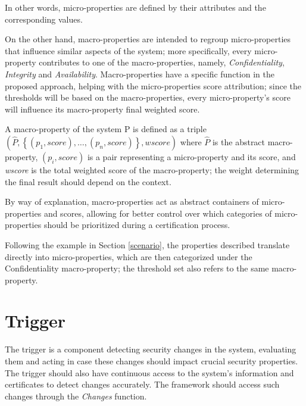 In other words, micro-properties are defined by their attributes and the corresponding values.


On the other hand, macro-properties are intended to regroup micro-properties that influence similar aspects of the system; more specifically, every micro-property contributes to one of the macro-properties, namely, \textit{Confidentiality}, \textit{Integrity} and \textit{Availability}. Macro-properties have a specific function in the proposed approach, helping with the micro-properties score attribution; since the thresholds will be based on the macro-properties, every micro-property's score will influence its macro-property final weighted score.

\begin{defn}
A macro-property of the system P is defined as a triple \\ \( \left ( \hat{P}, \left \{(p_1, score), \dots , (p_n, score )\right \}, wscore \right ) \) where \(\hat{P}\) is the abstract macro-property, \( \left (p_i, score \right ) \) is a pair representing a micro-property and its score, and \textit{wscore} is the total weighted score of the macro-property; the weight determining the final result should depend on the context.
\end{defn}

By way of explanation, macro-properties act as abstract containers of micro-properties and scores, allowing for better control over which categories of micro-properties should be prioritized during a certification process.

\begin{example}
Following the example in Section \ref{scenario}, the properties described translate directly into micro-properties, which are then categorized under the Confidentiality macro-property; the threshold set also refers to the same macro-property.
\end{example}

\section{Trigger}
\label{trigger}
The trigger is a component detecting security changes in the system, evaluating them and acting in case these changes should impact crucial security properties. The trigger should also have continuous access to the system's information and certificates to detect changes accurately. The framework should access such changes through the \textit{Changes} function. 

